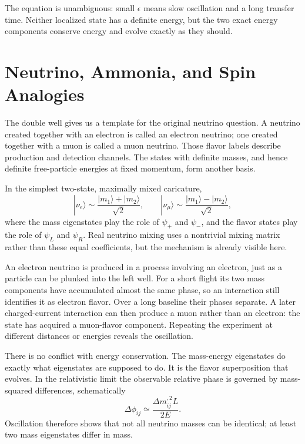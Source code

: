 The equation is unambiguous: small \(\epsilon\) means slow oscillation and a long transfer time. Neither localized state has a definite energy, but the two exact energy components conserve energy and evolve exactly as they should.

\section{Neutrino, Ammonia, and Spin Analogies}

The double well gives us a template for the original neutrino question. A neutrino created together with an electron is called an electron neutrino; one created together with a muon is called a muon neutrino. Those flavor labels describe production and detection channels. The states with definite masses, and hence definite free-particle energies at fixed momentum, form another basis.

In the simplest two-state, maximally mixed caricature,
\begin{equation}
|\nu_e\rangle \sim \frac{|m_1\rangle+|m_2\rangle}{\sqrt{2}},
\qquad
|\nu_\mu\rangle \sim \frac{|m_1\rangle-|m_2\rangle}{\sqrt{2}},
\end{equation}
where the mass eigenstates play the role of \(\psi_+\) and \(\psi_-\), and the flavor states play the role of \(\psi_L\) and \(\psi_R\). Real neutrino mixing uses a nontrivial mixing matrix rather than these equal coefficients, but the mechanism is already visible here.

An electron neutrino is produced in a process involving an electron, just as a particle can be plunked into the left well. For a short flight its two mass components have accumulated almost the same phase, so an interaction still identifies it as electron flavor. Over a long baseline their phases separate. A later charged-current interaction can then produce a muon rather than an electron: the state has acquired a muon-flavor component. Repeating the experiment at different distances or energies reveals the oscillation.

There is no conflict with energy conservation. The mass-energy eigenstates do exactly what eigenstates are supposed to do. It is the flavor superposition that evolves. In the relativistic limit the observable relative phase is governed by mass-squared differences, schematically
\begin{equation}
\Delta\phi_{ij}\simeq \frac{\Delta m_{ij}^{,2}L}{2E}.
\end{equation}
Oscillation therefore shows that not all neutrino masses can be identical; at least two mass eigenstates differ in mass.


